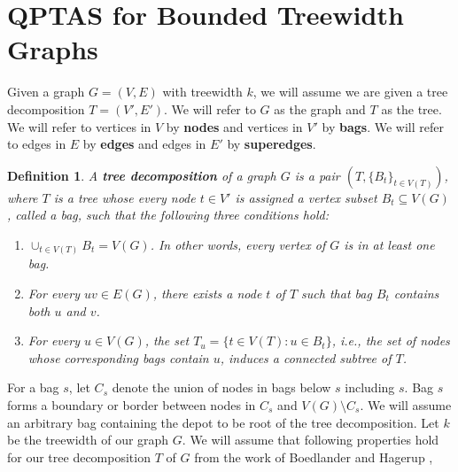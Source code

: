 \documentclass[twoside,leqno]{article}
\newtheorem{definition}{Definition}
\begin{document}
\section{QPTAS for Bounded Treewidth Graphs}
Given a graph $G = (V,E)$ with treewidth $k$, we will assume we are given a tree decomposition $T = (V',E')$. We will refer to $G$ as the graph and $T$ as the tree. We will refer to vertices in $V$ by \textbf{nodes} and vertices in $V'$ by \textbf{bags}. We will refer to edges in $E$ by \textbf{edges} and edges in $E'$ by \textbf{superedges}.
\begin{definition}
A \textbf{tree decomposition} of a graph $G$ is a pair $(T, \{B_t\}_{t \in V(T)})$, where $T$ is a tree whose every node $t \in V'$ is assigned a vertex subset $B_t \subseteq V(G)$, called a bag, such that the following three conditions hold:
\begin{enumerate}
    \item $\cup_{t \in V(T)} B_t = V(G)$. In other words, every vertex of $G$ is in at least one bag.
    \item For every $uv \in E(G)$, there exists a node $t$ of $T$ such that bag $B_t$ contains both $u$ and $v$.
    \item For every $u \in V(G)$, the set $T_u = \{t \in V(T) : u \in B_t \}$, i.e., the set of nodes whose corresponding bags contain $u$, induces a connected subtree of $T$.
\end{enumerate}
\end{definition}
For a bag $s$, let $C_s$ denote the union of nodes in bags below $s$ including $s$. Bag $s$ forms a boundary or border between nodes in $C_s$ and $V(G) \setminus C_s$. We will assume an arbitrary bag containing the depot to be root of the tree decomposition. Let $k$ be the treewidth of our graph $G$. We will assume that following properties hold for our tree decomposition $T$ of $G$ from the work of Boedlander and Hagerup \cite{BodlaenderH95},
\end{document}
